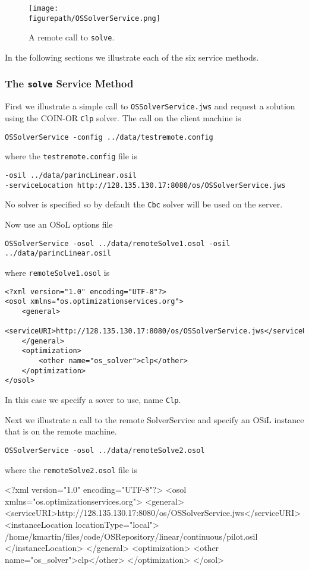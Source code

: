 \documentclass[11pt]{article}
\newcommand{\figurepath}{./figures}
\renewcommand{\_}{{\char"5F}}
\renewcommand{\{}{{\char"7B}}
\renewcommand{\}}{{\char"7D}}
\renewcommand{\^}{{\char"0D}}
\renewcommand{\'}{{\char"0D}}
\begin{document}
\begin{figure}
\centering
\texttt{[image: \\figurepath/OSSolverService.png]}
\caption{A remote call to {\tt solve}.} 
\label{figure:ossolverservice}
\end{figure}


In the following sections we illustrate each of the six service methods.

\subsubsection{The  {\tt solve} Service Method}\label{section:solve}

First we illustrate a simple call to   {\tt OSSolverService.jws} and request a solution using the COIN-OR  {\tt Clp} solver.  The call on the client machine is

\begin{verbatim}
OSSolverService -config ../data/testremote.config
\end{verbatim}
where the {\tt testremote.config} file is
\begin{verbatim}
-osil ../data/parincLinear.osil
-serviceLocation http://128.135.130.17:8080/os/OSSolverService.jws
\end{verbatim}

No solver is specified so by default the  {\tt Cbc} solver will be used on the server.  

Now use an OSoL options file
\begin{verbatim}
OSSolverService -osol ../data/remoteSolve1.osol -osil ../data/parincLinear.osil
\end{verbatim}
where {\tt remoteSolve1.osol} is
\begin{verbatim}
<?xml version="1.0" encoding="UTF-8"?>
<osol xmlns="os.optimizationservices.org">
    <general>
        <serviceURI>http://128.135.130.17:8080/os/OSSolverService.jws</serviceURI>
    </general>
    <optimization>
    	<other name="os_solver">clp</other>
    </optimization>
</osol>
\end{verbatim}
In this case we specify a sover to use, name {\tt Clp}.

Next we illustrate a call to the remote SolverService and specify an OSiL instance that is on the remote machine.
\begin{verbatim}
OSSolverService -osol ../data/remoteSolve2.osol
\end{verbatim}
where the {\tt remoteSolve2.osol} file is
\begin{verbatimtab}[4]
<?xml version="1.0" encoding="UTF-8"?>
<osol xmlns="os.optimizationservices.org">
    <general>
        <serviceURI>http://128.135.130.17:8080/os/OSSolverService.jws</serviceURI>
         <instanceLocation locationType="local">
	 /home/kmartin/files/code/OSRepository/linear/continuous/pilot.osil
	 </instanceLocation>
    </general>
    <optimization>
    	<other name="os_solver">clp</other>
    </optimization>
</osol>
\end{verbatimtab}
\end{document}

